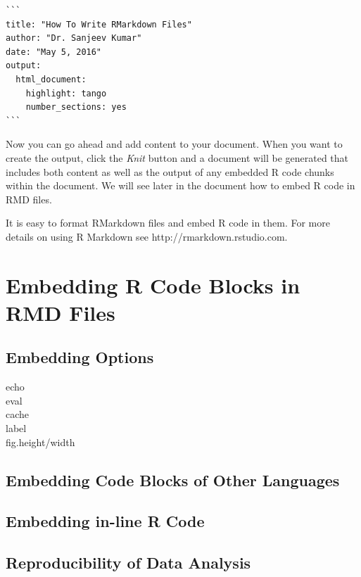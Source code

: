 \documentclass[10pt, letterpaper, twoside]{memoir}\usepackage{knitr}
\begin{document}
\begin{verbatim}
```
title: "How To Write RMarkdown Files"
author: "Dr. Sanjeev Kumar"
date: "May 5, 2016"
output:
  html_document: 
    highlight: tango
    number_sections: yes
```
\end{verbatim}

Now you can go ahead and add content to your document. When you want to create the output,  click the \emph{Knit} button and a document will be generated that includes both content as well as the output of any embedded R code chunks within the document. We will see later in the document how to embed R code in RMD files.

It is easy to format RMarkdown files and embed R code in them. For more details on using R Markdown see http://rmarkdown.rstudio.com.

\section{Embedding R Code Blocks in RMD Files}

\subsection{Embedding Options}

\begin{description}
  \item[echo]
  \item[eval]
  \item[cache]
  \item[label]
  \item[fig.height/width]
\end{description}

\subsection{Embedding Code Blocks of Other Languages }


\subsection{Embedding in-line R Code}


\subsection{Reproducibility of Data Analysis}
\end{document}
